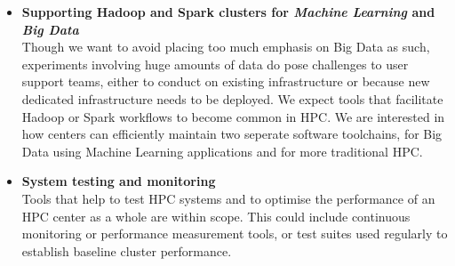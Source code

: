 \documentclass[a4paper,10pt]{article}
\begin{document}
\begin{itemize}

    \item \textbf{Supporting Hadoop and Spark clusters for \emph{Machine Learning} and \emph{Big Data}}\\
    Though we want to avoid placing too much emphasis on Big Data as such, 
    experiments involving huge amounts of data do pose challenges to user
    support teams, either to conduct on existing infrastructure or because new 
    dedicated infrastructure needs to be deployed. We expect tools that
    facilitate Hadoop or Spark workflows to become common in HPC. We are 
    interested in how centers can efficiently maintain two seperate software toolchains,
    for Big Data using Machine Learning applications and for more traditional HPC.



    \item \textbf{System testing and monitoring}\\
    Tools that help to test HPC systems and to optimise the performance of an HPC center
    as a whole are within scope.  This could include continuous monitoring or
    performance measurement tools, or test suites used regularly to establish baseline 
    cluster performance.
\end{itemize}
\end{document}
